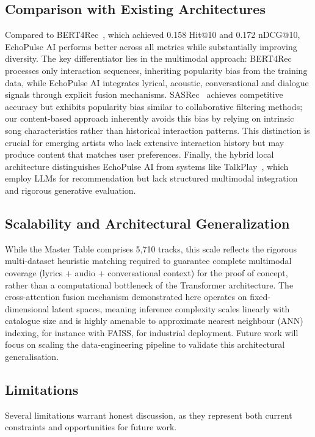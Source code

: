 \documentclass[]{ceurart}
\begin{document}
\subsection{Comparison with Existing Architectures}
Compared to BERT4Rec~\cite{sun2019bert4rec}, which achieved 0.158 Hit@10 and
0.172 nDCG@10, EchoPulse AI performs better across all metrics while
substantially improving diversity. The key differentiator lies in the
multimodal approach: BERT4Rec processes only interaction sequences, inheriting
popularity bias from the training data, while EchoPulse AI integrates lyrical,
acoustic, conversational and dialogue signals through explicit fusion
mechanisms. SASRec~\cite{kang2018self} achieves competitive accuracy but
exhibits popularity bias similar to collaborative filtering methods; our
content-based approach inherently avoids this bias by relying on intrinsic song
characteristics rather than historical interaction patterns. This distinction is
crucial for emerging artists who lack extensive interaction history but may
produce content that matches user preferences. Finally, the hybrid local
architecture distinguishes EchoPulse AI from systems like
TalkPlay~\cite{choi2025talkplaydata2}, which employ LLMs for recommendation but
lack structured multimodal integration and rigorous generative evaluation.

\subsection{Scalability and Architectural Generalization}
While the Master Table comprises 5,710 tracks, this scale reflects the rigorous
multi-dataset heuristic matching required to guarantee complete multimodal
coverage (lyrics $+$ audio $+$ conversational context) for the proof of concept,
rather than a computational bottleneck of the Transformer architecture. The
cross-attention fusion mechanism demonstrated here operates on
fixed-dimensional latent spaces, meaning inference complexity scales linearly
with catalogue size and is highly amenable to approximate nearest neighbour
(ANN) indexing, for instance with FAISS, for industrial deployment. Future work
will focus on scaling the data-engineering pipeline to validate this
architectural generalisation.

\subsection{Limitations}
Several limitations warrant honest discussion, as they represent both current
constraints and opportunities for future work.
\end{document}
